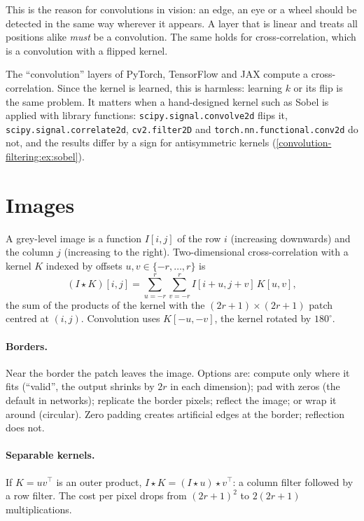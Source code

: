 \begin{notechapter}
This is the reason for convolutions in vision: an edge, an eye or a wheel should be
detected in the same way wherever it appears. A layer that is linear and treats all
positions alike \emph{must} be a convolution. The same holds for cross-correlation, which is a
convolution with a flipped kernel.

\begin{pitfall}
The ``convolution'' layers of PyTorch, TensorFlow and JAX compute a cross-correlation.
Since the kernel is learned, this is harmless: learning $k$ or its flip is the same problem.
It matters when a hand-designed kernel such as Sobel is applied with library functions:
\texttt{scipy.signal.convolve2d} flips it, \texttt{scipy.signal.correlate2d},
\texttt{cv2.filter2D} and \texttt{torch.nn.functional.conv2d} do not, and the results differ by a sign for
antisymmetric kernels (\cref{convolution-filtering:ex:sobel}).
\end{pitfall}

\section{Images}\label{convolution-filtering:sec:images}

A grey-level image is a function $I[i,j]$ of the row $i$ (increasing downwards) and the column $j$
(increasing to the right). Two-dimensional cross-correlation with a kernel $K$ indexed by
offsets $u,v\in\{-r,\dots,r\}$ is
\[
  (I\star K)[i,j] = \sum_{u=-r}^r\sum_{v=-r}^rI[i + u, j + v]\,K[u,v],
\]
the sum of the products of the kernel with the $(2r + 1)\times(2r + 1)$ patch centred at $(i,j)$. Convolution uses
$K[-u,-v]$, the kernel rotated by $180^\circ$.

\paragraph{Borders.} Near the border the patch leaves the image. Options are: compute only
where it fits (``valid'', the output shrinks by $2r$ in each dimension); pad with zeros (the
default in networks); replicate the border pixels; reflect the image; or wrap it around
(circular). Zero padding creates artificial edges at the border; reflection does not.

\paragraph{Separable kernels.} If $K = uv^\top$ is an outer product, $I\star K = (I\star u)\star v^\top$: a column filter followed
by a row filter. The cost per pixel drops from $(2r + 1)^2$ to $2(2r + 1)$ multiplications.


\end{notechapter}
